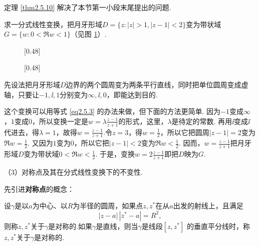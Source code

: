 定理 \ref{thm2.5.10} 解决了本节第一小段末尾提出的问题.
\begin{example}\label{exam2.5.11}
求一分式线性变换，把月牙形域$D=\{z:|z|>1,|z-1|<2\}$变为带状域$G=\{w:0<\Re w<1\}$（见图 \ref{fig2.12}）.
\end{example}
\begin{figure}[!ht]
\centering
\subcaptionbox{\label{fig2.12a}}[0.48\textwidth]
{
}
\subcaptionbox{\label{fig2.12b}}[0.48\textwidth]
{
}
\caption{\label{fig2.12}}
\end{figure}

\begin{solution}
先设法把月牙形域$D$边界的两个圆周变为两条平行直线，同时把单位圆周变成虚轴，只要让$-1,\ii,1$分别变为$\infty,\ii,0$，即能达到目的.

这个变换可以用等式 \ref{eq2.5.3} 的办法来做，但下面的方法更简单. 因为$-1$变成$\infty$，$1$变成$0$，所以变换一定是$w=\lambda\frac{z-1}{z+1}$的形式，这里，$\lambda$是待定的常数. 再用$\ii$变成$\ii$代进去，得$\lambda=1$，故得$w=\frac{z-1}{z+1}$.令$z=3$，得$w=\frac12$，所以它把圆周$|z-1|=2$变为$\Re w=\frac12$. 又因为$1$变为$0$，所以它把$|z-1|<2$变为$\Re w<\frac12$. 因而，$w=\frac{z-1}{z+1}$把月牙形域$D$变为带状域$0<\Re w<\frac12$. 于是，变换$w=2\frac{z-1}{z+1}$即把$D$映为$G$.
\end{solution}



（3）{\kaishu 对称点及其在分式线性变换下的不变性.}

先引进\textbf{对称点}的概念：
\begin{definition}\label{def2.5.12}
设$\gamma$是以$a$为中心、以$R$为半径的圆周，如果点$z,z^\ast$在从$a$出发的射线上，且满足
\begin{equation}\label{eq2.5.7}
|z-a|\,|z^\ast-a|=R^2,
\end{equation}
则称$z,z^\ast$关于$\gamma$是对称的.如果$\gamma$是直线，则当$\gamma$是线段$[z,z^\ast]$
的垂直平分线时，称$z,z^\ast$关于$\gamma$是对称的.
\end{definition}


